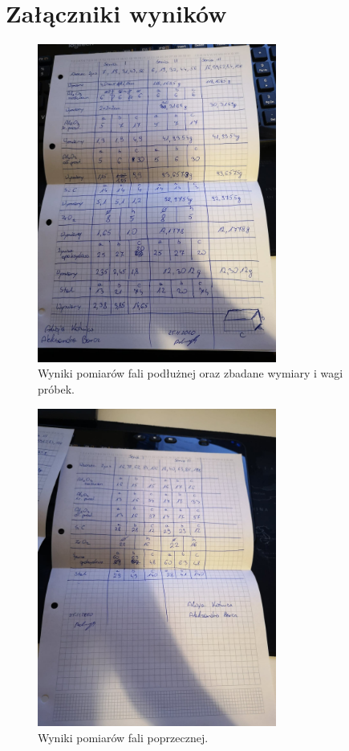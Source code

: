 \documentclass[a4paper,12pt]{article}
\begin{document}
\section{Załączniki wyników}

\begin{figure}[H]
    \centering
    \includegraphics[width=0.7\textwidth]{img/fala_podluzna.jpg}
    \caption{Wyniki pomiarów fali podłużnej oraz zbadane wymiary i wagi próbek.}
\end{figure}

\begin{figure}[H]
    \centering
    \includegraphics[width=0.7\textwidth]{img/fala_poprzeczna.jpg}
    \caption{Wyniki pomiarów fali poprzecznej.}
\end{figure}
\end{document}
